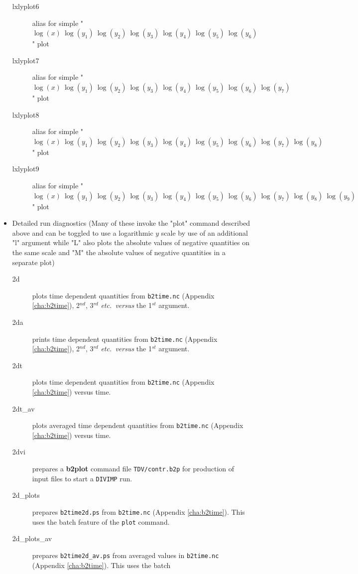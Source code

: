\documentclass[a4paper,10pt]{report}
\newcommand{\btwoplot}{{\bf b2plot} }
\begin{document}
\begin{itemize}
\begin{description}
  \item[lxlyplot6] alias for simple "$\log(x)~\log(y_1)~\log(y_2)~\log(y_3)~\log(y_4)~\log(y_5)~\log(y_6)$" plot
  \item[lxlyplot7] alias for simple "$\log(x)~\log(y_1)~\log(y_2)~\log(y_3)~\log(y_4)~\log(y_5)~\log(y_6)~\log(y_7)$" plot
  \item[lxlyplot8] alias for simple "$\log(x)~\log(y_1)~\log(y_2)~\log(y_3)~\log(y_4)~\log(y_5)~\log(y_6)~\log(y_7)~\log(y_8)$" plot
  \item[lxlyplot9] alias for simple "$\log(x)~\log(y_1)~\log(y_2)~\log(y_3)~\log(y_4)~\log(y_5)~\log(y_6)~\log(y_7)~\log(y_8)~\log(y_9)$" plot
  \end{description}
\item Detailed run diagnostics (Many of these invoke the "plot" command described above and can be toggled to use a
logarithmic $y$ scale by use of an additional "l" argument while "L" also plots the absolute values of
negative quantities on the same scale and "M" the absolute values of negative quantities in a separate plot)
  \begin{description}
  \item[2d] plots time dependent quantities from
    {\tt b2time.nc} (Appendix \ref{cha:b2time}), 2$^{nd}$, 3$^{rd}$ {\it etc.\ versus} the 1$^{st}$ argument.
  \item[2da] prints time dependent quantities from
    {\tt b2time.nc} (Appendix \ref{cha:b2time}), 2$^{nd}$, 3$^{rd}$ {\it etc.\ versus} the 1$^{st}$ argument.
  \item[2dt] plots time dependent quantities from
    {\tt b2time.nc} (Appendix \ref{cha:b2time}) versus time.
  \item[2dt\_av] plots averaged time dependent quantities from
    {\tt b2time.nc} (Appendix \ref{cha:b2time}) versus time.
  \item[2dvi] prepares a \btwoplot command file {\tt TDV/contr.b2p} for production of input files to start a {\tt DIVIMP} run.
  \item[2d\_plots]\label{script:2dplots} prepares {\tt b2time2d.ps} from
    {\tt b2time.nc} (Appendix \ref{cha:b2time}).  This uses the batch
    feature of the {\tt plot} command.
  \item[2d\_plots\_av] prepares {\tt b2time2d\_av.ps} from
    averaged values in {\tt b2time.nc} (Appendix \ref{cha:b2time}).  This uses the batch

\end{description}
\end{itemize}
\end{document}

